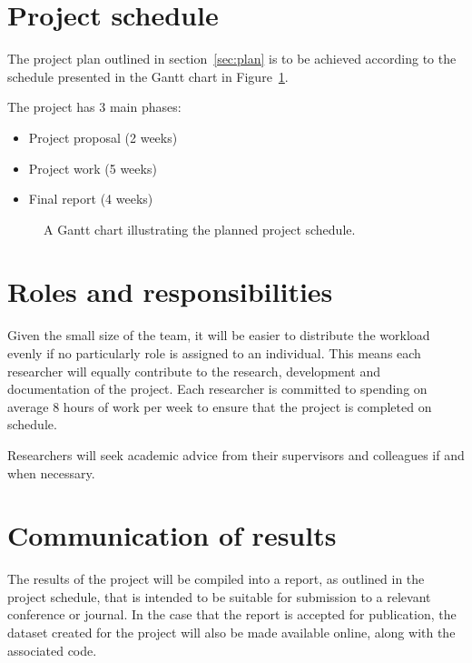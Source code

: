 \documentclass[11pt]{scrartcl}
\begin{document}
	\section{Project schedule} {
        The project plan outlined in section~\ref{sec:plan} is to be achieved
        according to the schedule presented in the Gantt chart in
        Figure~\ref{gantt:proposal}.

        The project has 3 main phases:
        
        \begin{itemize}
        	\item Project proposal (2 weeks)
        	\item Project work (5 weeks)
        	\item Final report (4 weeks)
        \end{itemize}

		\begin{figure}[H]
	        \makebox[\textwidth][c]{\resizebox{0.95\paperwidth}{!}{}}
			\caption[Project Schedule] {
                A Gantt chart illustrating the planned project schedule.
			}
			\label{gantt:proposal}
		\end{figure}
	}

	\section{Roles and responsibilities} {

		Given the small size of the team, it will be easier to distribute the workload evenly if no particularly role is assigned to an individual. This means each researcher will equally contribute to the research, development and documentation of the project. Each researcher is committed to spending on average 8 hours of work per week to ensure that the project is completed on schedule.
		
		Researchers will seek academic advice from their supervisors and colleagues if and when necessary.
    }

    \section{Communication of results} {

        The results of the project will be compiled into a report, as outlined
        in the project schedule, that is intended to be suitable for
        submission to a relevant conference or journal. In the case that the
        report is accepted for publication, the dataset created for the
        project will also be made available online, along with the associated code.
        
    }

	
	
\end{document}
